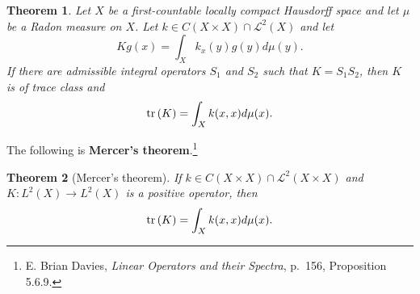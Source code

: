 \documentclass{article}
\newcommand{\tr}{\ensuremath\mathrm{tr}\,}
\newtheorem{theorem}{Theorem}
\theoremstyle{definition}
\begin{document}
\begin{theorem}
Let $X$ be a first-countable locally compact Hausdorff space and let $\mu$ be a Radon measure on $X$. 
Let $k \in C(X \times X) \cap \mathscr{L}^2(X)$ and let
\[
Kg(x) = \int_X k_x(y) g(y) d\mu(y).
\]
If there are admissible integral operators $S_1$ and $S_2$ such that $K=S_1 S_2$, then
$K$ is of trace class and
\[
\tr(K) = \int_X k(x,x) d\mu(x).
\]
\end{theorem}

The following is \textbf{Mercer's theorem}.\footnote{E. Brian Davies, {\em Linear Operators and their Spectra}, p.~156, Proposition 5.6.9.}

\begin{theorem}[Mercer's theorem]
If $k \in C(X \times X) \cap \mathscr{L}^2(X \times X)$ and $K:L^2(X) \to L^2(X)$ is a positive operator, then 
\[
\tr(K) = \int_X k(x,x) d\mu(x).
\]
\end{theorem}
\end{document}
